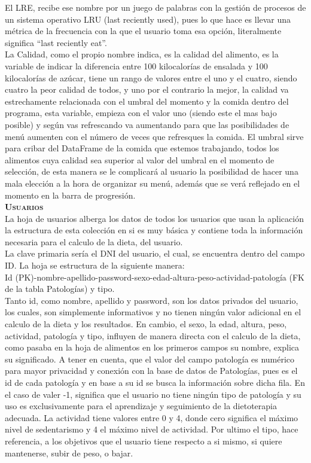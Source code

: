 El LRE, recibe ese nombre por un juego de palabras con la gestión de procesos de un sistema operativo LRU (last reciently used), pues lo que hace es llevar una métrica de la frecuencia con la que el usuario toma esa opción, literalmente significa “last reciently eat”. \\

La Calidad, como el propio nombre indica, es la calidad del alimento, es la variable de indicar la diferencia entre 100 kilocalorías de ensalada y 100 kilocalorías de azúcar, tiene un rango de valores entre el uno y el cuatro,  siendo cuatro la peor calidad de todos, y uno por el contrario la mejor, la calidad va estrechamente relacionada con el umbral del momento y la comida dentro del programa, esta variable, empieza con el valor uno (siendo este el mas bajo posible) y según vas refrescando va aumentando para que las posibilidades de menú aumenten con el número de veces que refresques la comida. El umbral sirve para cribar del DataFrame de la comida que estemos trabajando, todos los alimentos cuya calidad sea superior al valor del umbral en el momento de selección, de esta manera se le complicará al usuario la posibilidad de hacer una mala elección a la hora de organizar su menú, además que se verá reflejado en el momento en la barra de progresión.\\

\textbf{\textsc{Usuarios}}\\
La hoja de usuarios alberga los datos de todos los usuarios que usan la aplicación la estructura de esta colección en si es muy básica y contiene toda la información necesaria para el calculo de la dieta, del usuario.\\
La clave primaria sería el DNI del usuario, el cual, se encuentra dentro del campo ID. La hoja se estructura de la siguiente manera:\\
Id (PK)-nombre-apellido-password-sexo-edad-altura-peso-actividad-patología (FK de la tabla Patologías) y tipo.\\
Tanto id, como nombre, apellido y password, son los datos privados del usuario, los cuales, son simplemente informativos y no tienen ningún valor adicional en el calculo de la dieta y los resultados. En cambio, el sexo, la edad, altura, peso, actividad, patología y tipo, influyen de manera directa con el calculo de la dieta, como pasaba en la hoja de alimentos en los primeros campos su nombre, explica su significado. A tener en cuenta, que el valor del campo patología es numérico para mayor privacidad y conexión con la base de datos de Patologías, pues es el id de cada patología y en base a su id se busca la información sobre dicha fila. En el caso de valer -1, significa que el usuario no tiene ningún tipo de patología y su uso es exclusivamente para el aprendizaje y seguimiento de la dietoterapia adecuada. La actividad tiene valores entre 0 y 4, donde cero significa el máximo nivel de sedentarismo y 4 el máximo nivel de actividad. Por ultimo el tipo, hace referencia, a los objetivos que el usuario tiene respecto a si mismo, si quiere mantenerse, subir de peso, o bajar.\\

